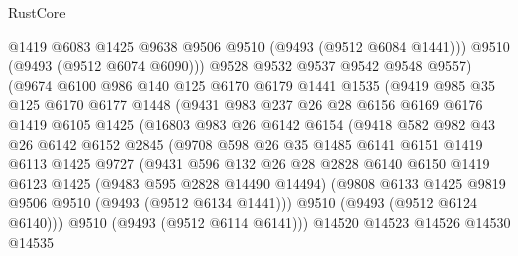 \begin{lexlean}{RustCore}
\begin{coremodule}
                    @1419
                    @6083
                    @1425
                    @9638
                    @9506
                    @9510
                    (@9493 (@9512 @6084 @1441)))
                  @9510
                  (@9493 (@9512 @6074 @6090)))
                @9528
                @9532
                @9537
                @9542
                @9548
                @9557)
              (@9674
                @6100
                @986
                @140
                @125
                @6170
                @6179
                @1441
                @1535
                (@9419
                  @985
                  @35
                  @125
                  @6170
                  @6177
                  @1448
                  (@9431
                    @983
                    @237
                    @26
                    @28
                    @6156
                    @6169
                    @6176
                    @1419
                    @6105
                    @1425
                    (@16803
                      @983
                      @26
                      @6142
                      @6154
                      (@9418
                        @582
                        @982
                        @43
                        @26
                        @6142
                        @6152
                        @2845
                        (@9708
                          @598
                          @26
                          @35
                          @1485
                          @6141
                          @6151
                          @1419
                          @6113
                          @1425
                          @9727
                          (@9431
                            @596
                            @132
                            @26
                            @28
                            @2828
                            @6140
                            @6150
                            @1419
                            @6123
                            @1425
                            (@9483 @595 @2828 @14490 @14494)
                            (@9808 @6133 @1425 @9819 @9506 @9510 (@9493 (@9512 @6134 @1441)))
                            @9510
                            (@9493 (@9512 @6124 @6140)))
                          @9510
                          (@9493 (@9512 @6114 @6141)))
                        @14520
                        @14523
                        @14526
                        @14530
                        @14535

\end{coremodule}
\end{lexlean}
